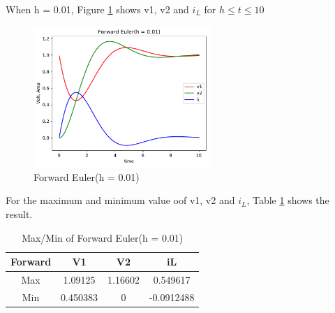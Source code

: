 \documentclass{article}
\begin{document}
When h = 0.01, Figure \ref{fig:for 001} shows v1, v2 and $i_L$ for $h \leq t \leq 10$
\begin{figure}[H]
    \centering
    \includegraphics[width=0.6\textwidth]{src/for_001.pdf}
    \caption{Forward Euler(h = 0.01)}
    \label{fig:for 001}
\end{figure}
For the maximum and minimum value oof v1, v2 and $i_L$, Table \ref{tab:for 001} shows the result.
\begin{table}[H]
    \begin{center}
        \begin{tabular}{|c|c|c|c|}
            \hline
            Forward & V1 & V2 & iL \\ \hline
            Max & 1.09125 & 1.16602 & 0.549617 \\ \hline
            Min & 0.450383 & 0 & -0.0912488 \\ \hline
        \end{tabular}
    \end{center}
    \caption{Max/Min of Forward Euler(h = 0.01)}
    \label{tab:for 001}
\end{table}
\end{document}
